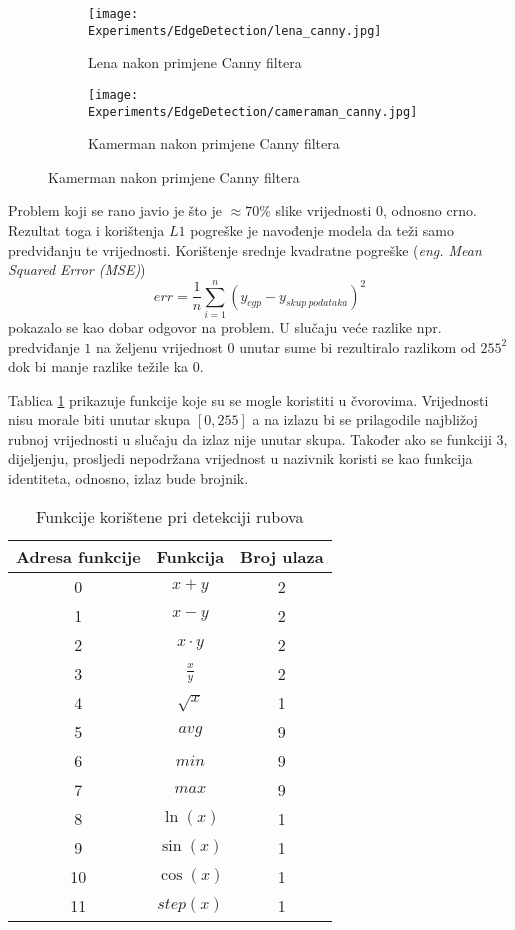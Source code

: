 \begin{figure}
	\centering
	\caption{Fotografije Lene i Kamermana nakon primjene detekcije ruba \emph{Canny} algoritmom}
	\begin{subfigure}[t]{0.45\textwidth}
		\texttt{[image: Experiments/EdgeDetection/lena\_canny.jpg]}
		\caption{Lena nakon primjene Canny filtera}
		\label{fig:lena_canny}
	\end{subfigure}
	\begin{subfigure}[t]{0.45\textwidth}
		\texttt{[image: Experiments/EdgeDetection/cameraman\_canny.jpg]}
		\caption{Kamerman nakon primjene Canny filtera}
		\label{fig:camerman_canny}
	\end{subfigure}
	\label{fig:edge_detection_train_val_in}
\end{figure}

Problem koji se rano javio je što je $\approx 70\%$ slike vrijednosti $0$, odnosno crno.
Rezultat toga i korištenja $L1$ pogreške je navođenje modela da teži samo predviđanju te vrijednosti.
Korištenje srednje kvadratne pogreške (\emph{eng. Mean Squared Error (MSE)})
$$err = \frac{1}{n}\sum_{i=1}^{n}(y_{cgp} - y_{skup\ podataka})^2$$
pokazalo se kao dobar odgovor na problem.
U slučaju veće razlike npr. predviđanje $1$ na željenu vrijednost $0$ unutar sume bi rezultiralo razlikom od $255^2$ dok bi manje razlike težile ka $0$.

Tablica \ref{table:edge_detection_function_set} prikazuje funkcije koje su se mogle koristiti u čvorovima.
Vrijednosti nisu morale biti unutar skupa $[0, 255]$ a na izlazu bi se prilagodile najbližoj rubnoj vrijednosti u slučaju da izlaz nije unutar skupa.
Također ako se funkciji $3$, dijeljenju, prosljedi nepodržana vrijednost u nazivnik koristi se kao funkcija identiteta, odnosno, izlaz bude brojnik.

\begin{table}
	\centering
	\begin{tabular}{||c c c||}
		\hline
		Adresa funkcije & Funkcija & Broj ulaza \\ [0.5ex]
		\hline \hline
		0 & $x + y$ & 2 \\
		1 & $x - y$ & 2 \\
		2 & $x \cdot y$ & 2 \\
		3 & $\frac{x}{y}$ & 2 \\
		4 & $\sqrt{x}$ & 1 \\
		5 & $avg$ & 9 \\
		6 & $min$ & 9 \\
		7 & $max$ & 9 \\
		8 & $\ln(x)$ & 1 \\
		9 & $\sin(x)$ & 1 \\
		10 & $\cos(x)$ & 1 \\
		11 & $step(x)$ & 1 \\ [1ex]
		\hline
	\end{tabular}
	\caption{Funkcije korištene pri detekciji rubova}
	\label{table:edge_detection_function_set}
\end{table}

